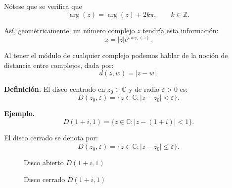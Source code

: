 \documentclass[a4paper,12pt]{article}
\begin{document}
\medskip
\noindent Nótese que se verifica que
\[
\arg(z) = \arg(z) + 2k\pi, \qquad k \in \mathbb{Z}.
\]

Así, geométricamente, un número complejo $z$ tendría esta información:
\[
z = |z| e^{i\arg(z)}.
\]



Al tener el módulo de cualquier complejo podemos hablar de la noción de distancia entre complejos,
dada por:
\[
d(z,w) = |z-w|.
\]

\noindent\textbf{Definición.} El disco centrado en $z_0 \in \mathbb{C}$ y de radio $\varepsilon > 0$ es:
\[
D(z_0,\varepsilon) = \{ z \in \mathbb{C} : |z - z_0| < \varepsilon \}.
\]

\noindent\textbf{Ejemplo.} 
\[
D(1+i,1) = \{ z \in \mathbb{C} : |z-(1+i)| < 1 \}.
\]

El disco cerrado se denota por:
\[
\overline{D}(z_0,\varepsilon) = \{ z \in \mathbb{C} : |z - z_0| \leq \varepsilon \}.
\]

\begin{figure}[h]
\centering

\begin{minipage}{0.4\textwidth}
\centering
{}

\medskip
{\small Disco abierto \(D(1+i,1)\)}
\end{minipage}
\hfill
\begin{minipage}{0.1\textwidth}
\centering
{}
\end{minipage}
\hfill
\begin{minipage}{0.4\textwidth}
\centering
{}

\medskip
{\small Disco cerrado \(\overline{D}(1+i,1)\)}
\end{minipage}

\end{figure}
\end{document}
